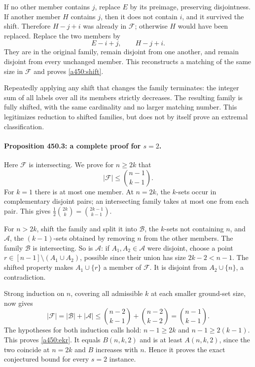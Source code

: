 \documentclass[11pt]{article}
\begin{document}
If no other member contains $j$, replace $E$ by its preimage, preserving disjointness. If another member $H$ contains $j$, then it does not contain $i$, and it survived the shift. Therefore $H-j+i$ was already in $\mathcal F$; otherwise $H$ would have been replaced. Replace the two members by
\[
                         E-i+j,\qquad H-j+i.
\]
They are in the original family, remain disjoint from one another, and remain disjoint from every unchanged member. This reconstructs a matching of the same size in $\mathcal F$ and proves \eqref{a450:shift}.

Repeatedly applying any shift that changes the family terminates: the integer sum of all labels over all its members strictly decreases. The resulting family is fully shifted, with the same cardinality and no larger matching number. This legitimizes reduction to shifted families, but does not by itself prove an extremal classification.

\paragraph{Proposition 450.3: a complete proof for $s=2$.}
Here $\mathcal F$ is intersecting. We prove for $n\geq2k$ that
\begin{equation}\label{a450:ekr}
                         |\mathcal F|\leq\binom{n-1}{k-1}.
\end{equation}
For $k=1$ there is at most one member. At $n=2k$, the $k$-sets occur in complementary disjoint pairs; an intersecting family takes at most one from each pair. This gives $\tfrac12\binom{2k}k=\binom{2k-1}{k-1}$.

For $n>2k$, shift the family and split it into $\mathcal B$, the $k$-sets not containing $n$, and $\mathcal A$, the $(k-1)$-sets obtained by removing $n$ from the other members. The family $\mathcal B$ is intersecting. So is $\mathcal A$: if $A_1,A_2\in\mathcal A$ were disjoint, choose a point $r\in[n-1]\setminus(A_1\cup A_2)$, possible since their union has size $2k-2<n-1$. The shifted property makes $A_1\cup\{r\}$ a member of $\mathcal F$. It is disjoint from $A_2\cup\{n\}$, a contradiction.

Strong induction on $n$, covering all admissible $k$ at each smaller ground-set size, now gives
\[
 |\mathcal F|=|\mathcal B|+|\mathcal A|
    \leq\binom{n-2}{k-1}+\binom{n-2}{k-2}
    =\binom{n-1}{k-1}.
\]
The hypotheses for both induction calls hold: $n-1\geq2k$ and $n-1\geq2(k-1)$. This proves \eqref{a450:ekr}. It equals $B(n,k,2)$ and is at least $A(n,k,2)$, since the two coincide at $n=2k$ and $B$ increases with $n$. Hence it proves the exact conjectured bound for every $s=2$ instance.
\end{document}
